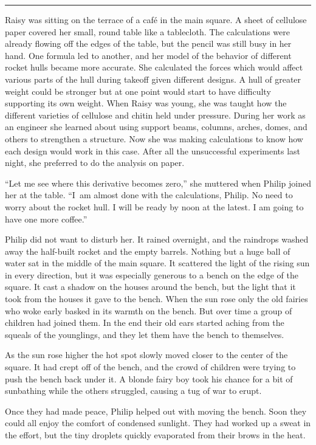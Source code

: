 \documentclass[10pt]{memoir}
\renewcommand{\pfbreakdisplay}{\bigskip \ding{166} \bigskip}
\newcommand{\secbreak}{\fancybreak{\pfbreakdisplay}}
\begin{document}
\secbreak

Raisy was sitting on the terrace of a café in the main square. A sheet of
cellulose paper covered her small, round table like a tablecloth. The
calculations were already flowing off the edges of the table, but the pencil
was still busy in her hand. One formula led to another, and her model of the
behavior of different rocket hulls became more accurate. She calculated the
forces which would affect various parts of the hull during takeoff given
different designs. A hull of greater weight could be stronger but at one point
would start to have difficulty supporting its own weight. When Raisy was young,
she was taught how the different varieties of cellulose and chitin held under
pressure. During her work as an engineer she learned about using support beams,
columns, arches, domes, and others to strengthen a structure. Now she was
making calculations to know how each design would work in this case. After all
the unsuccessful experiments last night, she preferred to do the analysis on
paper.

``Let me see where this derivative becomes zero,'' she muttered when Philip
joined her at the table. ``I~am almost done with the calculations, Philip. No
need to worry about the rocket hull. I will be ready by noon at the latest. I
am going to have one more coffee.''

Philip did not want to disturb her. It rained overnight, and the raindrops
washed away the half-built rocket and the empty barrels. Nothing but a huge
ball of water sat in the middle of the main square. It scattered the light of
the rising sun in every direction, but it was especially generous to a bench on
the edge of the square. It cast a shadow on the houses around the bench, but
the light that it took from the houses it gave to the bench. When the sun rose
only the old fairies who woke early basked in its warmth on the bench. But over
time a group of children had joined them. In the end their old ears started
aching from the squeals of the younglings, and they let them have the bench to
themselves.

As the sun rose higher the hot spot slowly moved closer to the center of the
square. It had crept off of the bench, and the crowd of children were trying
to push the bench back under it. A blonde fairy boy took his chance for a bit
of sunbathing while the others struggled, causing a tug of war to erupt.

Once they had made peace, Philip helped out with moving the bench. Soon they
could all enjoy the comfort of condensed sunlight. They had worked up a sweat
in the effort, but the tiny droplets quickly evaporated from their brows in the
heat.
\end{document}
